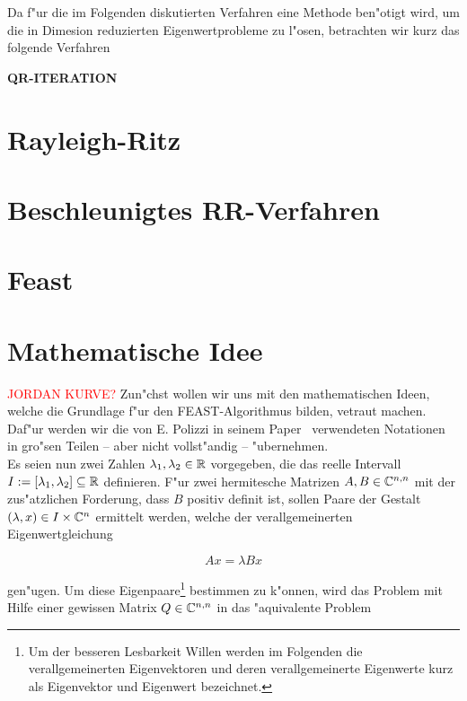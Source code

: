 Da f"ur die im Folgenden diskutierten Verfahren eine Methode ben"otigt wird,
um die in Dimesion reduzierten Eigenwertprobleme zu l"osen, betrachten wir kurz
das folgende Verfahren

\textbf{QR-ITERATION}

\section{Rayleigh-Ritz}

\section{Beschleunigtes RR-Verfahren}

\section{Feast}


\section{Mathematische Idee} \label{sec:math}%
\textcolor{red}{JORDAN KURVE?}
Zun"chst wollen wir uns mit den mathematischen Ideen, welche die
Grundlage f"ur den \textsc{FEAST}-Algorithmus bilden, vetraut machen. Daf"ur werden wir
die von E. Polizzi in seinem Paper~\cite{polizzi} verwendeten Notationen in gro"sen
Teilen -- aber nicht vollst"andig -- "ubernehmen.\\

Es seien nun zwei  Zahlen $\lambda_1, \lambda_2 \in \mathbb{R}$ vorgegeben, die
das reelle Intervall $I:=[\lambda_1, \lambda_2] \subseteq \mathbb{R}$ definieren.
F"ur zwei hermitesche Matrizen $A, B \in \mathbb{C}^{n,n}$ mit der zus"atzlichen
Forderung, dass $B$ positiv definit ist, sollen Paare der Gestalt
$(\lambda, x) \in I \times \mathbb{C}^n$ ermittelt werden, welche der verallgemeinerten
Eigenwertgleichung

  \begin{equation}\label{eq:eigen} %
  Ax = \lambda Bx
  \end{equation}

gen"ugen. Um diese Eigenpaare\footnote{Um der besseren Lesbarkeit Willen werden
im Folgenden die verallgemeinerten Eigenvektoren und deren verallgemeinerte
Eigenwerte kurz als Eigenvektor und Eigenwert bezeichnet.}
bestimmen zu k"onnen, wird das Problem mit Hilfe einer
gewissen Matrix $Q\in\mathbb{C}^{n,n}$ in das "aquivalente Problem

